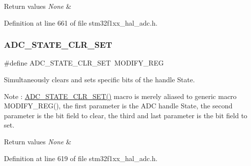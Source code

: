 \begin{DoxyRetVals}{Return values}
{\em None} & \\
\hline
\end{DoxyRetVals}


Definition at line 661 of file stm32f1xx\+\_\+hal\+\_\+adc.\+h.

\mbox{\label{group___a_d_c___private___macros_gaaf93e91b164d4a220aae475eff82665f}} 
\subsubsection{\texorpdfstring{A\+D\+C\+\_\+\+S\+T\+A\+T\+E\+\_\+\+C\+L\+R\+\_\+\+S\+ET}{ADC\_STATE\_CLR\_SET}}
{\footnotesize\ttfamily \#define A\+D\+C\+\_\+\+S\+T\+A\+T\+E\+\_\+\+C\+L\+R\+\_\+\+S\+ET~M\+O\+D\+I\+F\+Y\+\_\+\+R\+EG}



Simultaneously clears and sets specific bits of the handle State. 

\begin{DoxyNote}{Note}
\+: \hyperlink{group___a_d_c___private___macros_gaaf93e91b164d4a220aae475eff82665f}{A\+D\+C\+\_\+\+S\+T\+A\+T\+E\+\_\+\+C\+L\+R\+\_\+\+S\+E\+T()} macro is merely aliased to generic macro M\+O\+D\+I\+F\+Y\+\_\+\+R\+E\+G(), the first parameter is the A\+DC handle State, the second parameter is the bit field to clear, the third and last parameter is the bit field to set. 
\end{DoxyNote}

\begin{DoxyRetVals}{Return values}
{\em None} & \\
\hline
\end{DoxyRetVals}


Definition at line 619 of file stm32f1xx\+\_\+hal\+\_\+adc.\+h.

\mbox{\label{group___a_d_c___private___macros_ga331ffc36ba5922efeff033f075e8174d}} 

